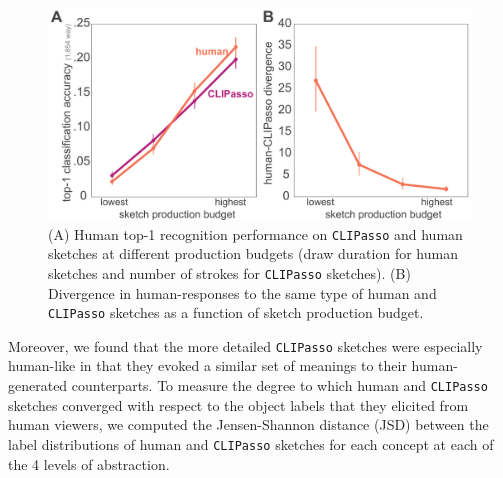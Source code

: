 \documentclass{article}
\begin{document}
\begin{figure}
    \centering
    \includegraphics[width=.6\textwidth]{neurips_figures/neurips_CLIPasso_edited.pdf}
    \caption{(A) Human top-1 recognition performance on \texttt{CLIPasso} and human sketches at different production budgets (draw duration for human sketches and number of strokes for \texttt{CLIPasso} sketches). (B) Divergence in human-responses to the same type of human and \texttt{CLIPasso} sketches as a function of sketch production budget.}
    \label{fig:CLIPasso-results}
\end{figure}

Moreover, we found that the more detailed \texttt{CLIPasso} sketches were especially human-like in that they evoked a similar set of meanings to their human-generated counterparts.
To measure the degree to which human and \texttt{CLIPasso} sketches converged with respect to the object labels that they elicited from human viewers, we computed the Jensen-Shannon distance (JSD) between the label distributions of human and \texttt{CLIPasso} sketches for each concept at each of the 4 levels of abstraction.
\end{document}
